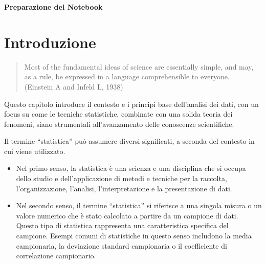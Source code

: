 \documentclass[
  letterpaper,
  DIV=11,
  numbers=noendperiod]{scrreprt}
\providecommand{\tightlist}{%
  \setlength{\itemsep}{0pt}\setlength{\parskip}{0pt}}\usepackage{longtable,booktabs,array}
\theoremstyle{definition}
\theoremstyle{remark}
\begin{document}
\textbf{Preparazione del Notebook}

\section*{Introduzione}\label{introduzione-2}


\begin{quote}
Most of the fundamental ideas of science are essentially simple, and
may, as a rule, be expressed in a language comprehensible to everyone.\\
(Einstein A and Infeld L, 1938)
\end{quote}

Questo capitolo introduce il contesto e i principi base dell'analisi dei
dati, con un focus su come le tecniche statistiche, combinate con una
solida teoria dei fenomeni, siano strumentali all'avanzamento delle
conoscenze scientifiche.

\begin{tcolorbox}[enhanced jigsaw, leftrule=.75mm, title=\textcolor{quarto-callout-note-color}{\faInfo}\hspace{0.5em}{Statistica}, colframe=quarto-callout-note-color-frame, colbacktitle=quarto-callout-note-color!10!white, arc=.35mm, toptitle=1mm, breakable, rightrule=.15mm, opacityback=0, bottomrule=.15mm, toprule=.15mm, bottomtitle=1mm, coltitle=black, titlerule=0mm, left=2mm, opacitybacktitle=0.6, colback=white]

Il termine ``statistica'' può assumere diversi significati, a seconda
del contesto in cui viene utilizzato.

\begin{itemize}
\tightlist
\item
  Nel primo senso, la statistica è una scienza e una disciplina che si
  occupa dello studio e dell'applicazione di metodi e tecniche per la
  raccolta, l'organizzazione, l'analisi, l'interpretazione e la
  presentazione di dati.
\item
  Nel secondo senso, il termine ``statistica'' si riferisce a una
  singola misura o un valore numerico che è stato calcolato a partire da
  un campione di dati. Questo tipo di statistica rappresenta una
  caratteristica specifica del campione. Esempi comuni di statistiche in
  questo senso includono la media campionaria, la deviazione standard
  campionaria o il coefficiente di correlazione campionario.
\end{itemize}

\end{tcolorbox}
\end{document}
